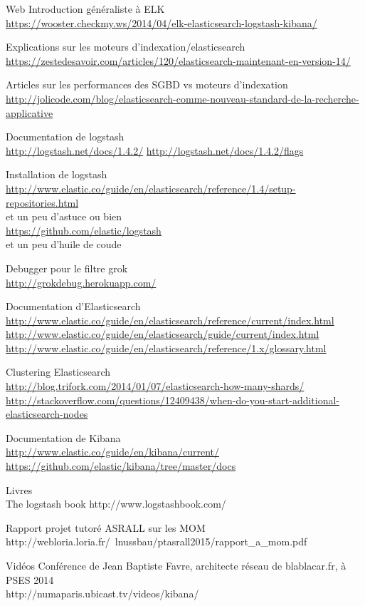 Web
Introduction généraliste à ELK \\
\url{https://wooster.checkmy.ws/2014/04/elk-elasticsearch-logstash-kibana/}

Explications sur les moteurs d'indexation/elasticsearch\\
\url{https://zestedesavoir.com/articles/120/elasticsearch-maintenant-en-version-14/}

Articles sur les performances des SGBD vs moteurs d'indexation\\
\url{http://jolicode.com/blog/elasticsearch-comme-nouveau-standard-de-la-recherche-applicative}


Documentation de logstash\\
\url{http://logstash.net/docs/1.4.2/}
\url{http://logstash.net/docs/1.4.2/flags}

Installation de logstash\\
\url{http://www.elastic.co/guide/en/elasticsearch/reference/1.4/setup-repositories.html}
\\ et un peu d'astuce ou bien \\
\url{https://github.com/elastic/logstash}
\\ et un peu d'huile de coude

Debugger pour le filtre grok\\
\url{http://grokdebug.herokuapp.com/}

Documentation d'Elasticsearch\\
\url{http://www.elastic.co/guide/en/elasticsearch/reference/current/index.html}\\
\url{http://www.elastic.co/guide/en/elasticsearch/guide/current/index.html}
\url{http://www.elastic.co/guide/en/elasticsearch/reference/1.x/glossary.html}

Clustering Elasticsearch\\
\url{http://blog.trifork.com/2014/01/07/elasticsearch-how-many-shards/}
\url{http://stackoverflow.com/questions/12409438/when-do-you-start-additional-elasticsearch-nodes}


Documentation de Kibana\\
\url{http://www.elastic.co/guide/en/kibana/current/}
\url{https://github.com/elastic/kibana/tree/master/docs}


Livres\\
The logstash book
http://www.logstashbook.com/

Rapport projet tutoré ASRALL sur les MOM
http://webloria.loria.fr/~lnussbau/ptasrall2015/rapport\_a\_mom.pdf


Vidéos
Conférence de Jean Baptiste Favre, architecte réseau de blablacar.fr, à PSES 2014\\
http://numaparis.ubicast.tv/videos/kibana/
